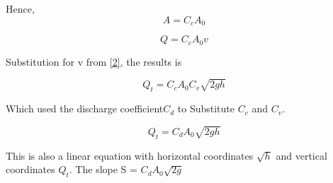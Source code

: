 Hence,
\begin{equation}
    \label{11}
    A=C_cA_0
\end{equation}

\begin{equation}
    \label{12}
    Q=C_cA_0v
\end{equation}

Substitution for v from \eqref{2}, the results is

\begin{equation}
    \label{13}
    Q_t=C_cA_0C_v\sqrt{2gh}
\end{equation}

Which used the discharge coefficient$C_d$ to Substitute $C_c$ and $C_v$.

\begin{equation}
    \label{14}
    Q_t=C_dA_0\sqrt{2gh}
\end{equation}

This is also a linear equation with horizontal 
coordinates $\sqrt{h}$ and vertical coordinates $Q_t$. The slope S =
$C_dA_0\sqrt{2g}$


